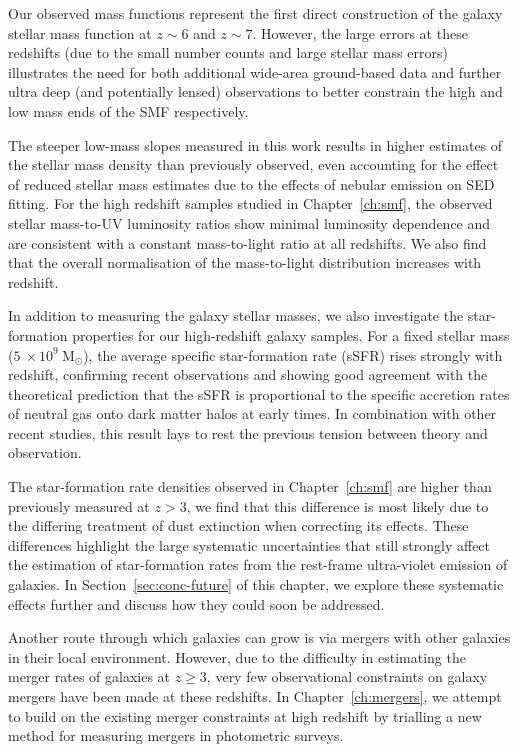 Our observed mass functions represent the first direct construction of the galaxy stellar mass function at $z\sim6$ and $z\sim7$. However, the large errors at these redshifts (due to the small number counts and large stellar mass errors) illustrates the need for both additional wide-area ground-based data and further ultra deep (and potentially lensed) observations to better constrain the high and low mass ends of the SMF respectively.

The steeper low-mass slopes measured in this work results in higher estimates of the stellar mass density than previously observed, even accounting for the effect of reduced stellar mass estimates due to the effects of nebular emission on SED fitting. For the high redshift samples studied in Chapter~\ref{ch:smf}, the observed stellar mass-to-UV luminosity ratios show minimal luminosity dependence and are consistent with a constant mass-to-light ratio at all redshifts. We also find that the overall normalisation of the mass-to-light distribution increases with redshift.

In addition to measuring the galaxy stellar masses, we also investigate the star-formation properties for our high-redshift galaxy samples. For a fixed stellar mass ($5~\times 10^{9}~\text{M}_{\odot}$), the average specific star-formation rate (sSFR) rises strongly with redshift, confirming recent observations and showing good agreement with the theoretical prediction that the sSFR is proportional to the specific accretion rates of neutral gas onto dark matter halos at early times. In combination with other recent studies, this result lays to rest the previous tension between theory and observation.

The star-formation rate densities observed in Chapter~\ref{ch:smf} are higher than previously measured at $z>3$, we find that this difference is most likely due to the differing treatment of dust extinction when correcting its effects. These differences highlight the large systematic uncertainties that still strongly affect the estimation of star-formation rates from the rest-frame ultra-violet emission of galaxies. In Section~\ref{sec:conc-future} of this chapter, we explore these systematic effects further and discuss how they could soon be addressed.

Another route through which galaxies can grow is via mergers with other galaxies in their local environment. However, due to the difficulty in estimating the merger rates of galaxies at $z\geq 3$, very few observational constraints on galaxy mergers have been made at these redshifts. In Chapter~\ref{ch:mergers}, we attempt to build on the existing merger constraints at high redshift by trialling a new method for measuring mergers in photometric surveys.


